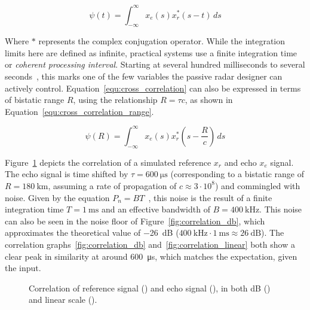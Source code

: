 \begin{equation}\label{equ:cross_correlation}
    \psi(t) = \int_{-\infty}^{\infty}{ x_{e}(s) x_{r}^{*}(s - t) \, d s}
\end{equation}

Where \(*\) represents the complex conjugation operator. While the integration limits here are defined as infinite, practical systems use a finite integration time or \emph{coherent processing interval}. Starting at several hundred milliseconds to several seconds~\cite[p.~134]{Malanowski2019}, this marks one of the few variables the passive radar designer can actively control. Equation~\ref{equ:cross_correlation} can also be expressed in terms of bistatic range \(R\), using the relationship \(R = \tau c\), as shown in Equation~\ref{equ:cross_correlation_range}.

\begin{equation}\label{equ:cross_correlation_range}
    \psi(R) = \int_{-\infty}^{\infty}{ x_{e}(s) x_{r}^{*} \left( s - \frac{R}{c} \right) \, d s}
\end{equation}

Figure~\ref{fig:signal_correlation} depicts the correlation of a simulated reference \(x_r\) and echo \(x_e\) signal. The echo signal is time shifted by \(\tau = \SI{600}{\micro\second}\) (corresponding to a bistatic range of \(R = \SI{180}{\kilo\metre}\), assuming a rate of propagation of \(c \approx 3 \cdot 10^{8}\)) and commingled with noise. Given by the equation \(P_n = BT\)~\cite[pp.~40--44]{Malanowski2019}, this noise is the result of a finite integration time \(T = \SI{1}{\milli\second}\) and an effective bandwidth of \(B = \SI{400}{\kilo\hertz}\). This noise can also be seen in the noise floor of Figure~\ref{fig:correlation_db}, which approximates the theoretical value of \SI{-26}{\deci\bel} (\(\SI{400}{\kilo\hertz} \cdot \SI{1}{\milli\second} \approx \SI{26}{\deci\bel}\)). The correlation graphs~\ref{fig:correlation_db} and~\ref{fig:correlation_linear} both show a clear peak in similarity at around \SI{600}{\micro\second}, which matches the expectation, given the input.

\begin{figure}[htb]
    \centering
    \linebreak
    \caption{Correlation of reference signal () and echo signal (), in both \si{\deci\bel} () and linear scale ().}\label{fig:signal_correlation}
\end{figure}

